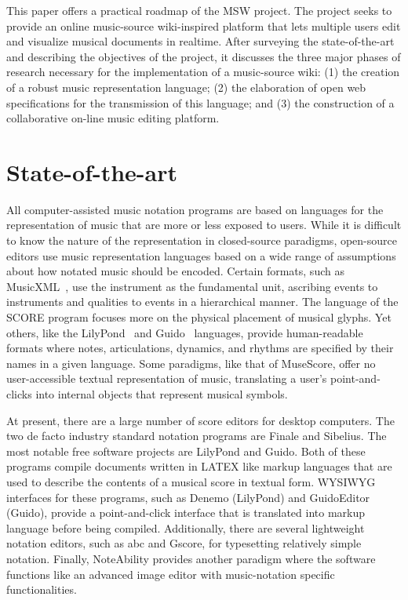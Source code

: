 \documentclass{article}
\begin{document}
This paper offers a practical roadmap
of the MSW project. The project seeks to provide an online music-source
wiki-inspired platform that lets multiple users edit and visualize
musical documents in realtime. After surveying the
state-of-the-art and describing the objectives of the project,
it discusses the three major phases of research necessary
for the implementation of a music-source wiki: (1) the creation of a robust
music representation language; (2) the elaboration of open web
specifications for the transmission of this language; and (3) the
construction of a collaborative on-line music editing platform.
\section{State-of-the-art}\label{sec:state-of-the-art}

All computer-assisted music notation programs are based on languages for the
representation of music that are more or less exposed to users. While it is
difficult to know the nature of the representation in closed-source
paradigms, open-source editors use music representation languages based on a
wide range of assumptions about how notated music should be encoded. Certain
formats, such as MusicXML~\cite{good2001musicxml}, use the instrument as the fundamental unit,
ascribing events to instruments and qualities to events in a hierarchical
manner. The language of the SCORE program focuses more on the physical
placement of musical glyphs. Yet others, like the LilyPond~\cite{lilypond06} and
Guido~\cite{hoos98}
languages, provide human-readable formats where notes, articulations,
dynamics, and rhythms are specified by their names in a given language. Some
paradigms, like that of MuseScore, offer no user-accessible textual representation
of music, translating a user’s point-and-clicks into internal objects that
represent musical symbols.

At present, there are a large number of score editors for desktop computers.
The two de facto industry standard notation programs are Finale and
Sibelius. The most notable free software projects are LilyPond and
Guido. Both of these programs compile documents written in LATEX like
markup languages that are used to describe the contents of a musical score
in textual form. WYSIWYG interfaces for these programs, such as Denemo
(LilyPond) and GuidoEditor (Guido), provide a point-and-click interface that
is translated into markup language before being compiled. Additionally,
there are several lightweight notation editors, such as abc and Gscore, for
typesetting relatively simple notation. Finally, NoteAbility provides
another paradigm where the software functions like an advanced image editor
with music-notation specific functionalities.
\end{document}
